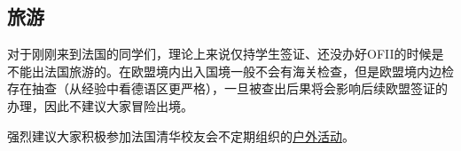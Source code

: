 \subsection{旅游}

对于刚刚来到法国的同学们，理论上来说仅持学生签证、还没办好OFII的时候是不能出法国旅游的。在欧盟境内出入国境一般不会有海关检查，但是欧盟境内边检存在抽查（从经验中看德语区更严格），一旦被查出后果将会影响后续欧盟签证的办理，因此不建议大家冒险出境。

强烈建议大家积极参加法国清华校友会不定期组织的\href{https://www.tsinghua-france.org/category/activities/outdoor/}{户外活动}。
